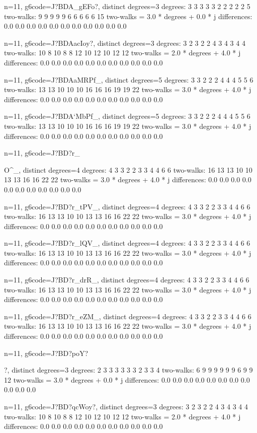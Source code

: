 {{{{{{{{{n=11, g6code=J?BDA_gEFo?, distinct degrees=3
degrees: 3 3 3 3 3 2 2 2 2 2 5 
two-walks: 9 9 9 9 9 6 6 6 6 6 15 
two-walks = 3.0 * degrees + 0.0 * j
differences: 0.0 0.0 0.0 0.0 0.0 0.0 0.0 0.0 0.0 0.0 0.0 

n=11, g6code=J?BDAacIoy?, distinct degrees=3
degrees: 3 2 3 2 2 4 3 4 3 4 4 
two-walks: 10 8 10 8 8 12 10 12 10 12 12 
two-walks = 2.0 * degrees + 4.0 * j
differences: 0.0 0.0 0.0 0.0 0.0 0.0 0.0 0.0 0.0 0.0 0.0 

n=11, g6code=J?BDAaMRPf_, distinct degrees=5
degrees: 3 3 2 2 2 4 4 4 5 5 6 
two-walks: 13 13 10 10 10 16 16 16 19 19 22 
two-walks = 3.0 * degrees + 4.0 * j
differences: 0.0 0.0 0.0 0.0 0.0 0.0 0.0 0.0 0.0 0.0 0.0 

n=11, g6code=J?BDA`MbPf_, distinct degrees=5
degrees: 3 3 2 2 2 4 4 4 5 5 6 
two-walks: 13 13 10 10 10 16 16 16 19 19 22 
two-walks = 3.0 * degrees + 4.0 * j
differences: 0.0 0.0 0.0 0.0 0.0 0.0 0.0 0.0 0.0 0.0 0.0 

n=11, g6code=J?BD?r_{O^_, distinct degrees=4
degrees: 4 3 3 2 2 3 3 4 4 6 6 
two-walks: 16 13 13 10 10 13 13 16 16 22 22 
two-walks = 3.0 * degrees + 4.0 * j
differences: 0.0 0.0 0.0 0.0 0.0 0.0 0.0 0.0 0.0 0.0 0.0 

n=11, g6code=J?BD?r_tPV_, distinct degrees=4
degrees: 4 3 3 2 2 3 3 4 4 6 6 
two-walks: 16 13 13 10 10 13 13 16 16 22 22 
two-walks = 3.0 * degrees + 4.0 * j
differences: 0.0 0.0 0.0 0.0 0.0 0.0 0.0 0.0 0.0 0.0 0.0 

n=11, g6code=J?BD?r_lQV_, distinct degrees=4
degrees: 4 3 3 2 2 3 3 4 4 6 6 
two-walks: 16 13 13 10 10 13 13 16 16 22 22 
two-walks = 3.0 * degrees + 4.0 * j
differences: 0.0 0.0 0.0 0.0 0.0 0.0 0.0 0.0 0.0 0.0 0.0 

n=11, g6code=J?BD?r_drR_, distinct degrees=4
degrees: 4 3 3 2 2 3 3 4 4 6 6 
two-walks: 16 13 13 10 10 13 13 16 16 22 22 
two-walks = 3.0 * degrees + 4.0 * j
differences: 0.0 0.0 0.0 0.0 0.0 0.0 0.0 0.0 0.0 0.0 0.0 

n=11, g6code=J?BD?r_eZM_, distinct degrees=4
degrees: 4 3 3 2 2 3 3 4 4 6 6 
two-walks: 16 13 13 10 10 13 13 16 16 22 22 
two-walks = 3.0 * degrees + 4.0 * j
differences: 0.0 0.0 0.0 0.0 0.0 0.0 0.0 0.0 0.0 0.0 0.0 

n=11, g6code=J?BD?poY?{?, distinct degrees=3
degrees: 2 3 3 3 3 3 3 2 3 3 4 
two-walks: 6 9 9 9 9 9 9 6 9 9 12 
two-walks = 3.0 * degrees + 0.0 * j
differences: 0.0 0.0 0.0 0.0 0.0 0.0 0.0 0.0 0.0 0.0 0.0 

n=11, g6code=J?BD?qcWoy?, distinct degrees=3
degrees: 3 2 3 2 2 4 3 4 3 4 4 
two-walks: 10 8 10 8 8 12 10 12 10 12 12 
two-walks = 2.0 * degrees + 4.0 * j
differences: 0.0 0.0 0.0 0.0 0.0 0.0 0.0 0.0 0.0 0.0 0.0 

}}}}}}}}}}}
